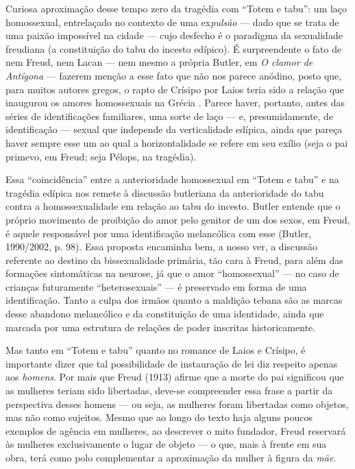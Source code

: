 Curiosa aproximação desse tempo zero da tragédia com ``Totem e tabu'':
um laço homossexual, entrelaçado no contexto de uma ex\emph{pulsão} ---
dado que se trata de uma paixão impossível na cidade --- cujo desfecho é
o paradigma da sexualidade freudiana (a constituição do tabu do incesto
edípico). É surpreendente o fato de nem Freud, nem Lacan --- nem mesmo a
própria Butler, em \emph{O clamor de Antígona} --- fazerem menção a esse
fato que não nos parece anódino, posto que, para muitos autores gregos,
o rapto de Crísipo por Laios teria sido a relação que inaugurou os
amores homossexuais na Grécia . Parece haver, portanto, antes das séries
de identificações familiares, uma sorte de laço --- e, presumidamente,
de identificação --- sexual que independe da verticalidade edípica,
ainda que pareça haver sempre esse um ao qual a horizontalidade se
refere em seu exílio (seja o pai primevo, em Freud; seja Pélops, na
tragédia).

Essa ``coincidência'' entre a anterioridade homossexual em ``Totem e
tabu'' e na tragédia edípica nos remete à discussão butleriana da
anterioridade do tabu contra a homossexualidade em relação ao tabu do
incesto. Butler entende que o próprio movimento de proibição do amor
pelo genitor de um dos sexos, em Freud, é aquele responsável por uma
identificação melancólica com esse (Butler, 1990/2002, p. 98). Essa
proposta encaminha bem, a nosso ver, a discussão referente ao destino da
bissexualidade primária, tão cara à Freud, para além das formações
sintomáticas na neurose, já que o amor ``homossexual'' --- no caso de
crianças futuramente ``heterosexuais'' --- é preservado em forma de uma
identificação. Tanto a culpa dos irmãos quanto a maldição tebana são as
marcas desse abandono melancólico e da constituição de uma identidade,
ainda que marcada por uma estrutura de relações de poder inscritas
historicamente.

Mas tanto em ``Totem e tabu'' quanto no romance de Laios e Crísipo, é
importante dizer que tal possibilidade de instauração de lei diz
respeito apenas aos \emph{homens}. Por mais que Freud (1913) afirme que
a morte do pai significou que as mulheres teriam sido libertadas,
deve-se compreender essa frase a partir da perspectiva desses homens ---
ou seja, as mulheres foram libertadas como objetos, mas não como
sujeitos. Mesmo que ao longo do texto haja alguns poucos exemplos de
agência em mulheres, ao descrever o mito fundador, Freud reservará às
mulheres exclusivamente o lugar de objeto --- o que, mais à frente em
sua obra, terá como polo complementar a aproximação da mulher à figura
da \emph{mãe}.

